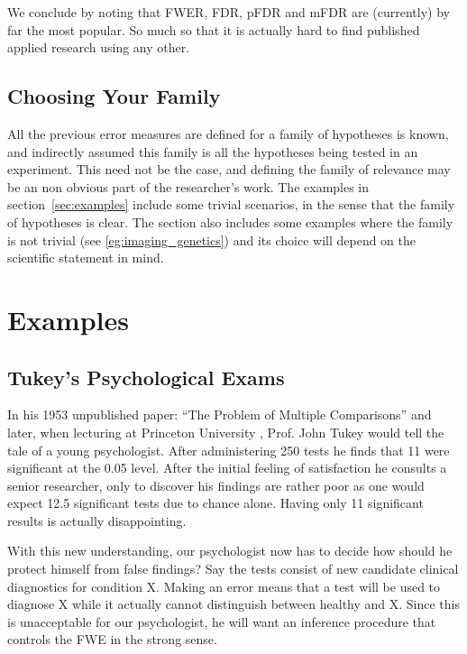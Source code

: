 \documentclass[review,12pt]{article}
\begin{document}
We conclude by noting that FWER, FDR, pFDR and mFDR are (currently) by far the most popular. So much so that it is actually hard to find published applied research using any other. 



\subsection{Choosing Your Family}
All the previous error measures are defined for a family of hypotheses is known, and indirectly assumed this family is all the hypotheses being tested in an experiment. This need not be the case, and defining the family of relevance may be an non obvious part of the researcher's work. The examples in section~\ref{sec:examples} include some trivial scenarios, in the sense that the family of hypotheses is clear. The section also includes some examples where the family is not trivial (see \ref{eg:imaging_genetics}) and its choice will depend on the scientific statement in mind.




\section{\label{sec:examples}Examples}



\subsection{Tukey's Psychological Exams}
In his 1953 unpublished paper: ``The Problem of Multiple Comparisons'' \citep{benjamini_john_2002} and later, when lecturing at Princeton University \citep{donoho_higher_2004}, Prof. John Tukey would tell the tale of a young psychologist. After administering 250 tests he finds that 11 were significant at the 0.05 level. After the initial feeling of satisfaction he consults a senior researcher, only to discover his findings are rather poor as one  would expect 12.5 significant tests due to chance alone. Having only 11 significant results is actually disappointing.


With this new understanding, our psychologist now has to decide how should he protect himself from false findings? 
Say the tests consist of new candidate clinical diagnostics for condition X. Making an error means that a test will be used to diagnose X while it actually cannot distinguish between healthy and X. Since this is unacceptable for our psychologist, he will want an inference procedure that controls the FWE in the strong sense. 
\end{document}
